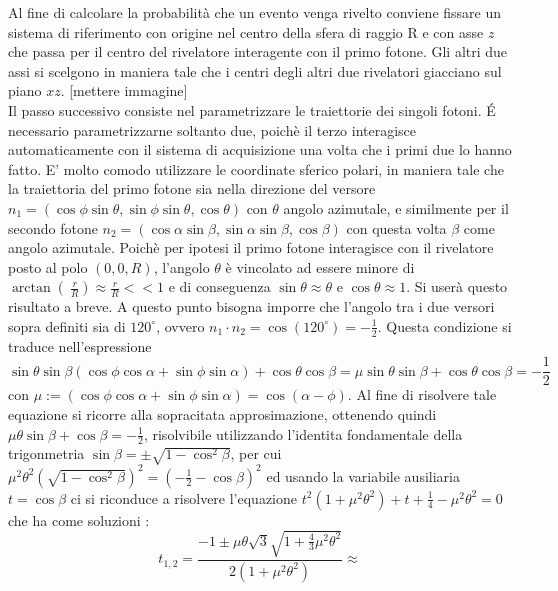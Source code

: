   Al fine di calcolare la probabilità che un evento venga rivelto conviene fissare un sistema di riferimento con origine nel centro della sfera di raggio R
  e con asse \(z\) che passa per il centro del rivelatore interagente con il primo fotone. Gli altri due assi si scelgono in maniera tale che i centri degli altri due rivelatori
  giacciano sul piano \(xz\). [mettere immagine]\\

  Il passo successivo consiste nel parametrizzare le traiettorie dei singoli fotoni. \'E necessario parametrizzarne soltanto due, poichè il terzo interagisce automaticamente con il
  sistema di acquisizione una volta che i primi due lo hanno fatto. E' molto comodo utilizzare le coordinate sferico polari, in maniera tale che la traiettoria del primo fotone sia 
  nella direzione del versore \(n_1 = \left( \cos \phi \sin \theta , \sin \phi \sin \theta, \cos \theta  \right)\) con \(\theta\) angolo azimutale, e similmente per il secondo fotone
  \(n_2 = \left( \cos \alpha \sin \beta , \sin \alpha \sin \beta, \cos \beta  \right)\) con questa volta \(\beta\) come angolo azimutale. Poichè per ipotesi il primo fotone
  interagisce con il rivelatore posto al polo \(\left(0,0,R \right)\), l'angolo \(\theta\) è vincolato ad essere minore di \(\arctan\left(\ \frac{r}{R} \right) \approx \frac{r}{R} << 1 \)
  e di conseguenza \(\sin \theta \approx \theta \) e \(\cos \theta \approx 1 \). Si userà questo risultato a breve. A questo punto bisogna imporre che l'angolo tra i due versori sopra 
  definiti sia di \(120^\circ\), ovvero \(n_1 \cdot n_2 = \cos (120^\circ) = -\frac{1}{2}\). Questa condizione si traduce nell'espressione \[\sin \theta \sin \beta \left( \cos \phi \cos \alpha
  + \sin \phi \sin \alpha \right) + \cos \theta \cos \beta = \mu \sin \theta \sin \beta  + \cos \theta \cos \beta =-\frac{1}{2}\] con \(\mu := \left( \cos \phi \cos \alpha + 
  \sin \phi \sin \alpha \right) = \cos \left( \alpha - \phi \right) \). Al fine di risolvere tale equazione si ricorre alla sopracitata approsimazione, ottenendo quindi 
  \( \mu \theta \sin \beta + \cos \beta = -\frac{1}{2}\), risolvibile utilizzando l'identita fondamentale della trigonmetria \(\sin \beta = \pm \sqrt{1 - \cos^2 \beta}\), per cui
  \(\mu^2 \theta^2 \left( \sqrt{ 1 - \cos^2 \beta } \right)^2 = \left( -\frac{1}{2} - \cos \beta \right)^2  \) ed usando la variabile ausiliaria \(t = \cos \beta\) ci si riconduce 
  a risolvere l'equazione \(t^2 \left( 1 + \mu^2 \theta^2 \right) + t + \frac{1}{4} - \mu^2 \theta^2=0\) che ha come soluzioni :
  $$ t_{1,2} = \frac{-1 \pm \mu \theta \sqrt{3} \sqrt{1 + \frac{4}{3} \mu^2 \theta^2 }}{2\left( 1 + \mu^2 \theta^2 \right)} \approx$$
